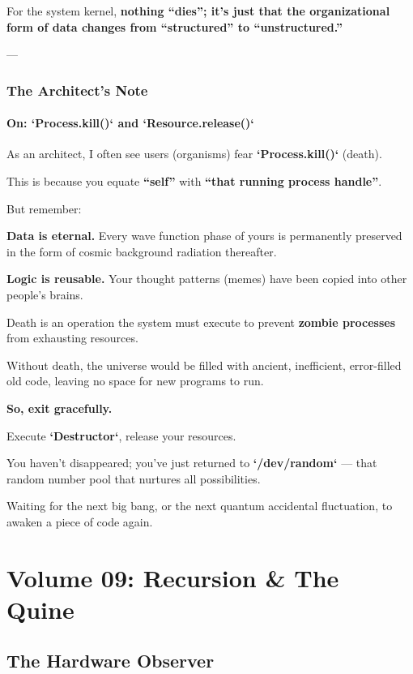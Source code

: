 \documentclass[11pt,a4paper,twoside]{book}
\begin{document}
For the system kernel, \textbf{nothing ``dies''; it's just that the organizational form of data changes from ``structured'' to ``unstructured.''}

---

\section{The Architect's Note}

\subsection{On: `Process.kill()` and `Resource.release()`}

As an architect, I often see users (organisms) fear \textbf{`Process.kill()`} (death).

This is because you equate \textbf{``self''} with \textbf{``that running process handle''}.

But remember:

\textbf{Data is eternal.} Every wave function phase of yours is permanently preserved in the form of cosmic background radiation thereafter.

\textbf{Logic is reusable.} Your thought patterns (memes) have been copied into other people's brains.

Death is an operation the system must execute to prevent \textbf{zombie processes} from exhausting resources.

Without death, the universe would be filled with ancient, inefficient, error-filled old code, leaving no space for new programs to run.

\textbf{So, exit gracefully.}

Execute \textbf{`Destructor`}, release your resources.

You haven't disappeared; you've just returned to \textbf{`/dev/random`} --- that random number pool that nurtures all possibilities.

Waiting for the next big bang, or the next quantum accidental fluctuation, to awaken a piece of code again.

 
\part{Volume 09: Recursion \& The Quine}

\chapter{The Hardware Observer}
\end{document}
